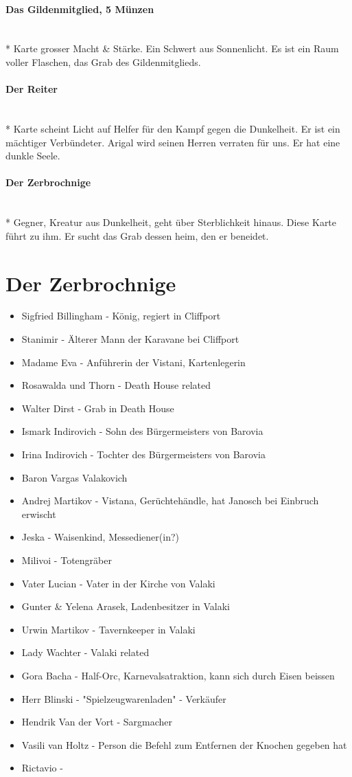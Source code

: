 \documentclass{article}
\begin{document}
\paragraph{Das Gildenmitglied, 5 Münzen} ~\\*
Karte grosser Macht \& Stärke. Ein Schwert aus Sonnenlicht. Es ist ein Raum voller Flaschen, das Grab des Gildenmitglieds. 
\paragraph{Der Reiter} ~\\*
Karte scheint Licht auf Helfer für den Kampf gegen die Dunkelheit. Er ist ein mächtiger Verbündeter. Arigal wird seinen Herren verraten für uns. Er hat eine dunkle Seele.
\paragraph{Der Zerbrochnige} ~\\*
Gegner, Kreatur aus Dunkelheit, geht über Sterblichkeit hinaus. Diese Karte führt zu ihm. Er sucht das Grab dessen heim, den er beneidet.
\section{Der Zerbrochnige}
\begin{itemize}
	\item Sigfried Billingham - König, regiert in Cliffport
	\item Stanimir - Älterer Mann der Karavane bei Cliffport
	\item Madame Eva - Anführerin der Vistani, Kartenlegerin
	\item Rosawalda und Thorn - Death House related
	\item Walter Dirst - Grab in Death House
	\item Ismark Indirovich - Sohn des Bürgermeisters von Barovia
	\item Irina Indirovich - Tochter des Bürgermeisters von Barovia
	\item Baron Vargas Valakovich
	\item Andrej Martikov - Vistana, Gerüchtehändle, hat Janosch bei Einbruch erwischt
	\item Jeska - Waisenkind, Messediener(in?)
	\item Milivoi - Totengräber
	\item Vater Lucian - Vater in der Kirche von Valaki
	\item Gunter \& Yelena Arasek, Ladenbesitzer in Valaki
	\item Urwin Martikov - Tavernkeeper in Valaki
	\item Lady Wachter - Valaki related
	\item Gora Bacha - Half-Orc, Karnevalsatraktion, kann sich durch Eisen beissen
	\item Herr Blinski - "Spielzeugwarenladen" - Verkäufer
	\item Hendrik Van der Vort - Sargmacher 
	\item Vasili van Holtz - Person die Befehl zum Entfernen der Knochen gegeben hat
	\item Rictavio - 
\end{itemize}
\end{document}
